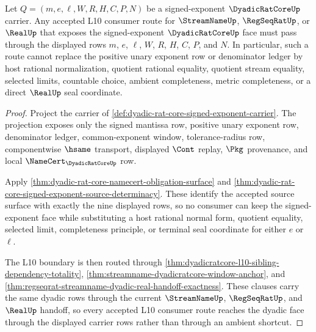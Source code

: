 \begin{theorem}
\label{thm:dyadic-rat-core-signed-exponent-no-shortcut-boundary}
Let $Q=(m,e,\ell,W,R,H,C,P,N)$ be a signed-exponent $\DyadicRatCoreUp$ carrier. Any accepted L10 consumer route for $\StreamNameUp$, $\RegSeqRatUp$, or $\RealUp$ that exposes the signed-exponent $\DyadicRatCoreUp$ face must pass through the displayed rows $m$, $e$, $\ell$, $W$, $R$, $H$, $C$, $P$, and $N$. In particular, such a route cannot replace the positive unary exponent row or denominator ledger by host rational normalization, quotient rational equality, quotient stream equality, selected limits, countable choice, ambient completeness, metric completeness, or a direct $\RealUp$ seal coordinate.
\end{theorem}
\begin{proof}
Project the carrier of \autoref{def:dyadic-rat-core-signed-exponent-carrier}. The projection exposes only the signed mantissa row, positive unary exponent row, denominator ledger, common-exponent window, tolerance-radius row, componentwise $\hsame$ transport, displayed $\Cont$ replay, $\Pkg$ provenance, and local $\NameCert_{\DyadicRatCoreUp}$ row.

Apply \autoref{thm:dyadic-rat-core-namecert-obligation-surface} and \autoref{thm:dyadic-rat-core-signed-exponent-source-determinacy}. These identify the accepted source surface with exactly the nine displayed rows, so no consumer can keep the signed-exponent face while substituting a host rational normal form, quotient equality, selected limit, completeness principle, or terminal seal coordinate for either $e$ or $\ell$.

The L10 boundary is then routed through \autoref{thm:dyadicratcore-l10-sibling-dependency-totality}, \autoref{thm:streamname-dyadicratcore-window-anchor}, and \autoref{thm:regseqrat-streamname-dyadic-real-handoff-exactness}. These clauses carry the same dyadic rows through the current $\StreamNameUp$, $\RegSeqRatUp$, and $\RealUp$ handoff, so every accepted L10 consumer route reaches the dyadic face through the displayed carrier rows rather than through an ambient shortcut.
\end{proof}
